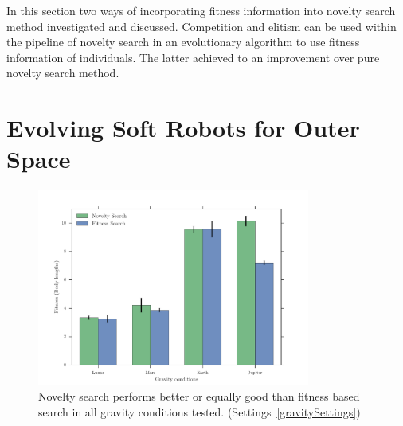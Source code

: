 In this section two ways of incorporating fitness information into novelty search method investigated and discussed. Competition and elitism can be used within the pipeline of novelty search in an evolutionary algorithm to use fitness information of individuals. The latter achieved to an improvement over pure novelty search method.















\section{Evolving Soft Robots for Outer Space}  

\begin{figure}[t!]
\centering
\includegraphics[width=0.8\textwidth]{../Figures/Results/GravityExperiment.pdf}
\caption{Novelty search performs better or equally good than fitness based search in all gravity conditions tested. (Settings~\ref{gravitySettings})}
\label{fig:gravityConditions}
\end{figure}

